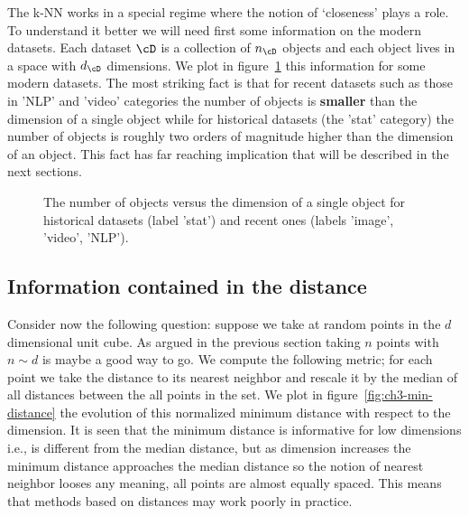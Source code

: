 The k-NN works in a special regime where the notion of `closeness' plays
a role. To understand it better we will need first some information on the
modern datasets. Each dataset $\cD$ is a collection of $n_{\cD}$ objects and each object
lives in a space with $d_{\cD}$ dimensions. We plot in figure~\ref{fig:ch3-datasets} this information
for some modern datasets. The most striking fact is that for recent datasets
such as those in 'NLP' and 'video' categories the number of objects is \textbf{smaller}
than the dimension of a single object while for historical datasets (the 'stat'
category) the number of objects is roughly two orders of magnitude higher
than the dimension of an object. This fact has far reaching implication that
will be described in the next sections.

\begin{figure}[h]\centering
\caption{The number of objects versus the dimension of a single object
for historical datasets (label 'stat') and recent ones (labels 'image', 'video',
'NLP').}\label{fig:ch3-datasets}
\end{figure}

\subsection{Information contained in the distance}
\label{sec:ch3-info-distance}

Consider now the following question: suppose we take at random points in the
$d$ dimensional unit cube. As argued in the previous section taking $n$ points with
$n \sim d$ is maybe a good way to go. We compute the following metric; for each
point we take the distance to its nearest neighbor and rescale it by the median
of all distances between the all points in the set. We plot in figure~\ref{fig:ch3-min-distance} the
evolution of this normalized minimum distance with respect to the dimension.
It is seen that the minimum distance is informative for low dimensions i.e., is
different from the median distance, but as dimension increases the minimum
distance approaches the median distance so the notion of nearest neighbor
looses any meaning, all points are almost equally spaced. This means that
methods based on distances may work poorly in practice.

